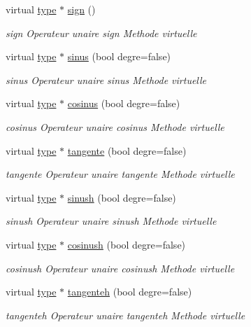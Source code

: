 \begin{DoxyCompactItemize}
virtual \hyperlink{classtype}{type} $\ast$ \hyperlink{classtype_a3ec9f31aec3ddc52efe2adff634a671a}{sign} ()
\begin{DoxyCompactList}\small\item\em sign Operateur unaire sign Methode virtuelle \end{DoxyCompactList}\item 
virtual \hyperlink{classtype}{type} $\ast$ \hyperlink{classtype_acfff98100e9af7fe51f22ca553b49652}{sinus} (bool degre=false)
\begin{DoxyCompactList}\small\item\em sinus Operateur unaire sinus Methode virtuelle \end{DoxyCompactList}\item 
virtual \hyperlink{classtype}{type} $\ast$ \hyperlink{classtype_a4bf0be87d5e0314cc6a29ce86930d34e}{cosinus} (bool degre=false)
\begin{DoxyCompactList}\small\item\em cosinus Operateur unaire cosinus Methode virtuelle \end{DoxyCompactList}\item 
virtual \hyperlink{classtype}{type} $\ast$ \hyperlink{classtype_a0e48cd1a39419994f14550b2fd188e1d}{tangente} (bool degre=false)
\begin{DoxyCompactList}\small\item\em tangente Operateur unaire tangente Methode virtuelle \end{DoxyCompactList}\item 
virtual \hyperlink{classtype}{type} $\ast$ \hyperlink{classtype_a1bb104502962725e2d8d1909a208e7fa}{sinush} (bool degre=false)
\begin{DoxyCompactList}\small\item\em sinush Operateur unaire sinush Methode virtuelle \end{DoxyCompactList}\item 
virtual \hyperlink{classtype}{type} $\ast$ \hyperlink{classtype_a387836cc1a0dd2a20ece2f721fab822a}{cosinush} (bool degre=false)
\begin{DoxyCompactList}\small\item\em cosinush Operateur unaire cosinush Methode virtuelle \end{DoxyCompactList}\item 
virtual \hyperlink{classtype}{type} $\ast$ \hyperlink{classtype_a36763dd363a8de97e4a52aa87776e61c}{tangenteh} (bool degre=false)
\begin{DoxyCompactList}\small\item\em tangenteh Operateur unaire tangenteh Methode virtuelle \end{DoxyCompactList}\item 

\end{DoxyCompactItemize}
